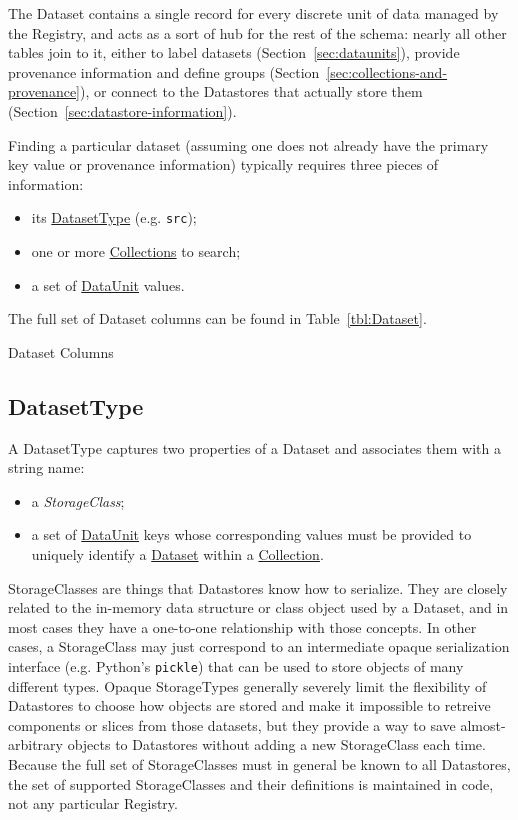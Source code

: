 \documentclass[DM,toc]{lsstdoc}
\newcommand{\tblref}[1]{\hyperref[tbl:#1]{#1}}
\newcommand{\coltable}[1]{
    \begin{table}[htb]
        {
            \footnotesize
            
        }
        \caption{#1 Columns}
        \label{tbl:#1}
    \end{table}
}
\begin{document}
The Dataset contains a single record for every discrete unit of data managed by the Registry, and acts as a sort of hub for the rest of the schema: nearly all other tables join to it, either to label datasets (Section~\ref{sec:dataunits}), provide provenance information and define groups (Section~\ref{sec:collections-and-provenance}), or connect to the Datastores that actually store them (Section~\ref{sec:datastore-information}).

Finding a particular dataset (assuming one does not already have the primary key value or provenance information) typically requires three pieces of information:
\begin{itemize}
    \item its \hyperref[sec:DatasetType]{DatasetType} (e.g. \texttt{src});
    \item one or more \hyperref[sec:collections]{Collections} to search;
    \item a set of \hyperref[sec:dataunits]{DataUnit} values.
\end{itemize}

The full set of Dataset columns can be found in Table~\ref{tbl:Dataset}.

\coltable{Dataset}


\subsection{DatasetType}
\label{sec:DatasetType}

A DatasetType captures two properties of a Dataset and associates them with a string name:
\begin{itemize}
    \item a \emph{StorageClass};
    \item a set of \hyperref[sec:dataunits]{DataUnit} keys whose corresponding values must be provided to uniquely identify a \tblref{Dataset} within a \hyperref[sec:collections]{Collection}.
\end{itemize}

StorageClasses are things that Datastores know how to serialize.
They are closely related to the in-memory data structure or class object used by a Dataset, and in most cases they have a one-to-one relationship with those concepts.
In other cases, a StorageClass may just correspond to an intermediate opaque serialization interface (e.g. Python's \texttt{pickle}) that can be used to store objects of many different types.
Opaque StorageTypes generally severely limit the flexibility of Datastores to choose how objects are stored and make it impossible to retreive components or slices from those datasets, but they provide a way to save almost-arbitrary objects to Datastores without adding a new StorageClass each time.
Because the full set of StorageClasses must in general be known to all Datastores, the set of supported StorageClasses and their definitions is maintained in code, not any particular Registry.
\end{document}
